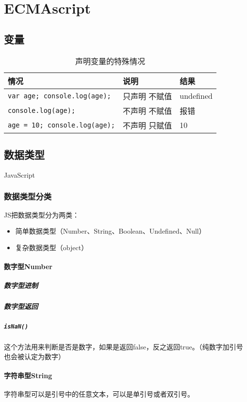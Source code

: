 \chapter{ECMAscript}
\section{变量}
\begin{table}
\caption{声明变量的特殊情况}
\centering
\begin{tabular}{lll}
\hline
情况&说明&结果\\
\hline
\verb|var age; console.log(age);|&只声明 不赋值&undefined\\
\verb|console.log(age);|&不声明 不赋值&报错\\
\verb|age = 10; console.log(age);|&不声明 只赋值&10\\
\hline
\end{tabular}
\end{table}
\section{数据类型}
JavaScript
\subsection{数据类型分类}
JS把数据类型分为两类：
\begin{itemize}
	\item 简单数据类型（Number、String、Boolean、Undefined、Null）
	\item 复杂数据类型（object）
\end{itemize}
\subsubsection{数字型Number}
\paragraph{数字型进制}
\paragraph{数字型返回}

\paragraph{\texttt{isNaN()}}
这个方法用来判断是否是数字，如果是返回false，反之返回true。（纯数字加引号也会被认定为数字）
\subsubsection{字符串型String}
字符串型可以是引号中的任意文本，可以是单引号或者双引号。

